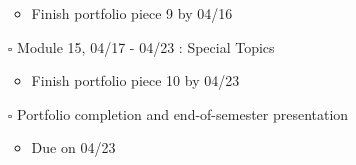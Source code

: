 \documentclass[
]{article}
\providecommand{\tightlist}{%
  \setlength{\itemsep}{0pt}\setlength{\parskip}{0pt}}
\begin{document}
\begin{itemize}
  \begin{itemize}
  \tightlist
  \item
    Finish portfolio piece 9 by 04/16
  \end{itemize}
\item[$\square$]
  Module 15, 04/17 - 04/23 : Special Topics

  \begin{itemize}
  \tightlist
  \item
    Finish portfolio piece 10 by 04/23
  \end{itemize}
\item[$\square$]
  Portfolio completion and end-of-semester presentation

  \begin{itemize}
  \tightlist
  \item
    Due on 04/23
  \end{itemize}
\end{itemize}
\end{document}
